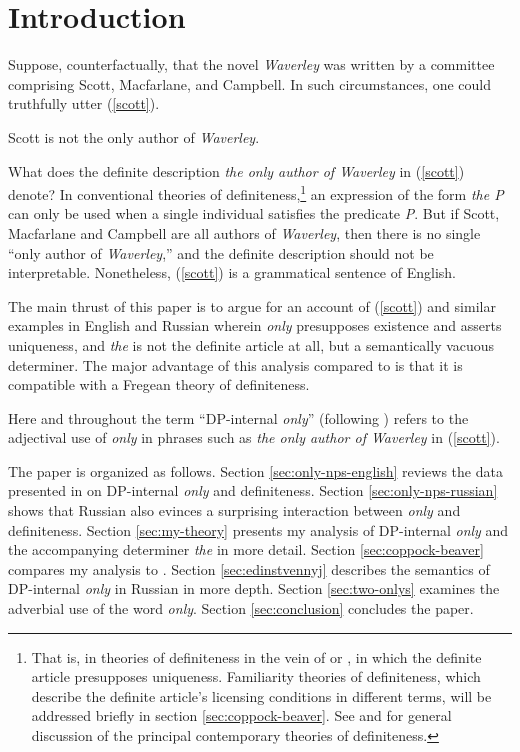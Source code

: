 \section{Introduction \label{sec:intro}}
Suppose, counterfactually, that the novel \textit{Waverley} was written by a committee comprising Scott, Macfarlane, and Campbell. In such circumstances, one could truthfully utter (\ref{scott}).

\begin{exe}
	\ex \label{scott} Scott is not the only author of \textit{Waverley}.\\
	\hspace*{\fill} \citep{cb2015}  %
\end{exe}

What does the definite description \textit{the only author of Waverley} in (\ref{scott}) denote? In conventional theories of definiteness,\footnote{That is, in theories of definiteness in the vein of \citet{frege} or \citet{strawson50}, in which the definite article presupposes uniqueness. Familiarity theories of definiteness, which describe the definite article's licensing conditions in different terms, will be addressed briefly in section \ref{sec:coppock-beaver}. See \citet[chap. 1]{schwarz09} and \citet{horn-abbott-2012} for general discussion of the principal contemporary theories of definiteness.} an expression of the form \textit{the P} can only be used when a single individual satisfies the predicate \textit{P}. But if Scott, Macfarlane and Campbell are all authors of \textit{Waverley}, then there is no single ``only author of \textit{Waverley},'' and the definite description should not be interpretable. Nonetheless, (\ref{scott}) is a grammatical sentence of English.

The main thrust of this paper is to argue for an account of (\ref{scott}) and similar examples in English and Russian wherein \textit{only} presupposes existence and asserts uniqueness, and \textit{the} is not the definite article at all, but a semantically vacuous determiner. The major advantage of this analysis compared to  is that it is compatible with a Fregean theory of definiteness.

Here and throughout the term ``DP-internal \textit{only}'' (following \citet{mcnally08}) refers to the adjectival use of \textit{only} in phrases such as \textit{the only author of Waverley} in (\ref{scott}).

The paper is organized as follows. Section \ref{sec:only-nps-english} reviews the data presented in \citet{cb2015} on DP-internal \textit{only} and definiteness. Section \ref{sec:only-nps-russian} shows that Russian also evinces a surprising interaction between \textit{only} and definiteness. Section \ref{sec:my-theory} presents my analysis of DP-internal \textit{only} and the accompanying determiner \textit{the} in more detail. Section \ref{sec:coppock-beaver} compares my analysis to . Section \ref{sec:edinstvennyj} describes the semantics of DP-internal \textit{only} in Russian in more depth. Section \ref{sec:two-onlys} examines the adverbial use of the word \textit{only}. Section \ref{sec:conclusion} concludes the paper.